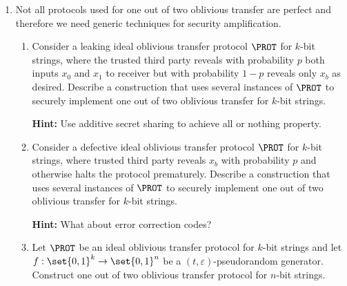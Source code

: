 \documentclass{article}
\begin{document}
\begin{enumerate}
 \item Not all protocols used for one out of two oblivious transfer
   are perfect and therefore we need generic techniques for security
   amplification.
   \begin{enumerate}
   \item Consider a leaking ideal oblivious transfer protocol $\PROT$
     for $k$-bit strings, where the trusted third party reveals with
     probability $p$ both inputs $x_0$ and $x_1$ to receiver but with
     probability $1-p$ reveals only $x_b$ as desired. Describe a
     construction that uses several instances of $\PROT$ to securely
     implement one out of two oblivious transfer for $k$-bit strings.

     \textbf{Hint:} Use additive secret sharing to achieve all or
     nothing property.

   \item Consider a defective ideal oblivious transfer protocol
     $\PROT$ for $k$-bit strings, where trusted third party reveals
     $x_b$ with probability $p$ and otherwise halts the protocol
     prematurely. Describe a construction that uses several instances
     of $\PROT$ to securely implement one out of two oblivious
     transfer for $k$-bit strings.

     \textbf{Hint:} What about error correction codes?
   \item Let $\PROT$ be an ideal oblivious transfer protocol for
     $k$-bit strings and let $f:\set{0,1}^k\to\set{0,1}^n$ be a
     $(t,\varepsilon)$-pseudorandom generator.  Construct one out of
     two oblivious transfer protocol for $n$-bit strings.
   \end{enumerate}


\end{enumerate}
\end{document}

